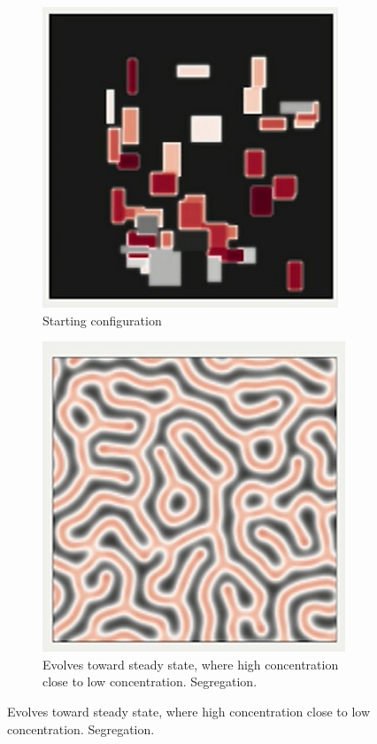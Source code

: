 \documentclass[]{article}
\begin{document}
\begin{figure}[H]
	\caption{Grey Scott Reaction}
	
	\begin{subfigure}[b]{0.45\textwidth}
		\centering
		\caption{Starting configuration}
		\includegraphics[width=\textwidth]{GreyScottInitial}
	\end{subfigure}
	\begin{subfigure}[b]{0.45\textwidth}
		\centering
		\caption{Evolves toward steady state,  where high concentration close to low concentration. Segregation.}
		\includegraphics[width=\textwidth]{GreyScottFinal}
	\end{subfigure}
\end{figure}
\end{document}
